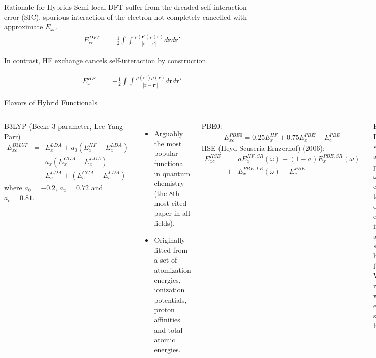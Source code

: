 \documentclass[aspectratio=169]{beamer}
\let \vec \mathbf
\begin{document}
\begin{frame}{Rationale for Hybrids}
Semi-local DFT suffer from the dreaded self-interaction error (SIC), spurious interaction of the electron not completely cancelled with approximate $E_{xc}$.
\begin{eqnarray*}
    E^{DFT}_{ee} & = & \frac{1}{2} \int \int \frac{\rho(\vec{r'})\rho(\vec{r})}{|\vec{r}-\vec{r'}|} d\vec{r}d\vec{r'}
\end{eqnarray*}

In contrast, HF exchange cancels self-interaction by construction.

\begin{eqnarray*}
    E^{HF}_{x} & = & - \frac{1}{2} \int \int \frac{\rho(\vec{r'})\rho(\vec{r})}{|\vec{r}-\vec{r'}|} d\vec{r}d\vec{r'}
\end{eqnarray*}
\end{frame} 

\begin{frame}{Flavors of Hybrid Functionals}
\begin{columns}
B3LYP (Becke 3-parameter, Lee-Yang-Parr)\cite{beckeDensityFunctionalThermochemistry1993}
\begin{eqnarray*}
    E^{B3LYP}_{xc} & = & E_x^{LDA} + a_0 (E_x^{HF} - E_x^{LDA})\\
    & + & a_x (E_x^{GGA}-E_x^{LDA}) \\
    & +&  E_c^{LDA} +(E_c^{GGA} - E_c^{LDA})
\end{eqnarray*}
where $a_0 = -0.2$, $a_x = 0.72$ and $a_c = 0.81$.
\begin{itemize}
    \item Arguably the most popular functional in quantum chemistry (the 8th most cited paper in all fields).
    \item Originally fitted from a set of atomization energies, ionization potentials, proton affinities and total atomic energies.
\end{itemize}

PBE0:
\begin{eqnarray*}
    E^{PBE0}_{xc} = 0.25E_x^{HF} + 0.75 E_x^{PBE} + E_c^{PBE}
\end{eqnarray*}
HSE (Heyd-Scuseria-Ernzerhof) (2006):\cite{heydHybridFunctionalsBased2003,heydErratumHybridFunctionals2006}
\begin{eqnarray*}
    E^{HSE}_{xc} & = & a E_x^{HF,SR}(\omega) +  (1-a) E_x^{PBE,SR}(\omega) \\
    &+& E_x^{PBE,LR}(\omega) + E_c^{PBE}
\end{eqnarray*}

Effectively PBE0, but with an adjustable parameter $\omega$ ($\sim 0.2$) controlling the range of the exchange interaction, aka a \textit{screened} hybrid functional. Works remarkably well for extended systems like solids.
\end{columns} 


\end{frame} 
\end{document}
